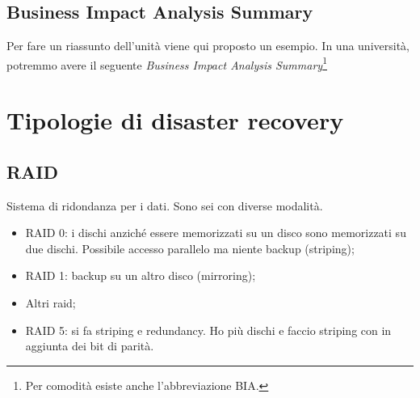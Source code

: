 \subsection{Business Impact Analysis Summary}

Per fare un riassunto dell'unità viene qui proposto un esempio. In una
università, potremmo avere il seguente \textit{Business Impact Analysis
Summary}\footnote{Per comodità esiste anche l'abbreviazione BIA.}

\begin{table}[H]
\centering
{}
\caption{Un esempio di BIA per una Università}
\end{table}


\section{Tipologie di disaster recovery}

\subsection{RAID}

Sistema di ridondanza per i dati. Sono sei con diverse modalità.
\begin{itemize}
  \item RAID 0: i dischi anziché essere memorizzati su un disco sono
  memorizzati su due dischi. Possibile accesso parallelo ma niente backup
  (striping);
  \item RAID 1: backup su un altro disco (mirroring);
  \item Altri raid;
  \item RAID 5: si fa striping e redundancy. Ho più dischi e faccio striping
  con in aggiunta dei bit di parità.
\end{itemize}

